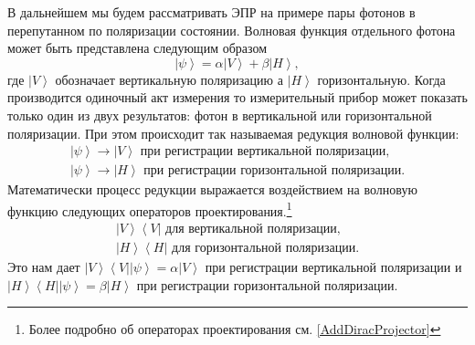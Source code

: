 В дальнейшем мы будем рассматривать ЭПР на примере пары фотонов в перепутанном 
по поляризации состоянии. Волновая функция отдельного фотона может быть 
представлена следующим образом
\begin{equation}
\left|\psi\right> = \alpha \left|V\right> +
\beta \left|H\right>, 
\label{eqEntaglementPSI}
\end{equation}
где $\left|V\right>$ обозначает вертикальную поляризацию а 
$\left|H\right>$ горизонтальную. Когда производится одиночный
акт измерения то измерительный прибор может показать только один из двух 
результатов: фотон в вертикальной или горизонтальной поляризации. При этом происходит 
так называемая редукция волновой функции:
\begin{eqnarray}
\left|\psi\right> \rightarrow \left|V\right> \mbox{ при регистрации вертикальной поляризации},
\nonumber \\
\left|\psi\right> \rightarrow \left|H\right> \mbox{ при регистрации горизонтальной поляризации}.
\nonumber
\end{eqnarray}
Математически процесс редукции выражается воздействием на волновую функцию следующих 
операторов проектирования.\footnote{Более подробно об операторах
  проектирования см. \autoref{AddDiracProjector}}
\begin{eqnarray}
\left|V\right>\left<V\right| \mbox{ для вертикальной поляризации},
\nonumber \\
 \left|H\right>\left<H\right| \mbox{ для горизонтальной поляризации}.
\label{eqEntaglementProjector}
\end{eqnarray}
Это нам дает $\left|V\right>\left<V\right|\left|\psi\right> = \alpha \left|V\right>$ 
при регистрации вертикальной поляризации и
$\left|H\right>\left<H\right|\left|\psi\right> = \beta \left|H\right>$ 
при регистрации горизонтальной поляризации.


